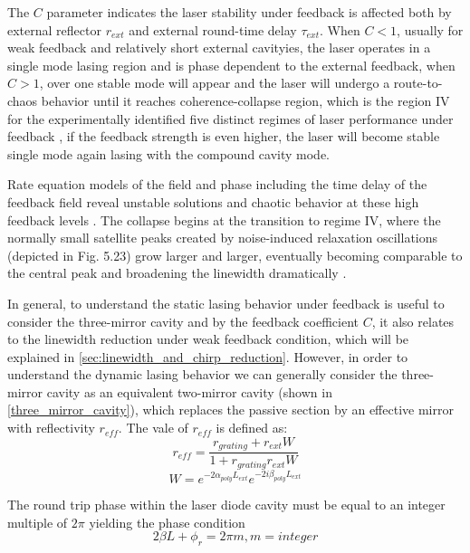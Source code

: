 The $C$ parameter indicates the laser stability under feedback is affected both by external reflector $r_{ext}$ and external round-time delay $\tau_{ext}$. When $C<1$, usually for weak feedback and relatively short external cavityies, the laser operates in a single mode lasing region and is phase dependent to the external feedback, when $C>1$, over one stable mode will appear and the laser will undergo a route-to-chaos behavior until it reaches coherence-collapse \cite{} region, which is the region IV for the experimentally identified five distinct regimes of laser performance under feedback \cite{tkach1986regimes}, if the feedback strength is even higher, the laser will become stable single mode again lasing with the compound cavity mode.

Rate equation models of the field and phase including the time delay of the feedback field reveal unstable solutions and chaotic behavior at these high feedback levels \cite{tkach1986regimes}. The collapse begins at the transition to regime IV, where the normally small satellite peaks created by noise-induced relaxation oscillations (depicted in Fig. 5.23) grow larger and larger, eventually becoming comparable to the central peak and broadening the linewidth dramatically \cite{coldren2012diode}.

In general, to understand the static lasing behavior under feedback is useful to consider the three-mirror cavity and by the feedback coefficient $C$, it also relates to the linewidth reduction under weak feedback condition, which will be explained in \autoref{sec:linewidth_and_chirp_reduction}. However, in order to understand the dynamic lasing behavior we can generally consider the three-mirror cavity as an equivalent two-mirror cavity (shown in \autoref{three_mirror_cavity}), which replaces the passive section by an effective mirror with reflectivity $r_{eff}$. The vale of $r_{eff}$ is defined as:
\begin{equation}
    r_{eff}=\frac{r_{grating}+r_{ext}W}{1+r_{grating}r_{ext}W}
    \label{effective_reflectivity}
\end{equation}
\begin{equation}
    W=e^{-2\alpha_{poly}L_{ext}}e^{-2i\beta_{poly}L_{ext}}
\end{equation}

The round trip phase within the laser diode cavity must be equal to an integer multiple of $2\pi$ yielding the phase condition
\begin{equation}
    2\beta L+\phi_r=2\pi m, m=integer
\end{equation}

